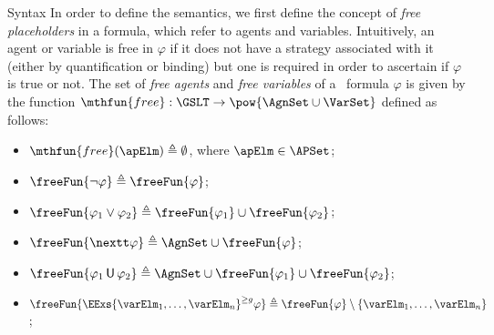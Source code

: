 \begin{subsection}{Syntax}
		In order to define the semantics, we first define the concept of
		\emph{free placeholders} in a formula, which refer to agents and variables.
		Intuitively, an agent or variable is free in $\varphi$ if it does
		not have a strategy associated with it (either by quantification or binding) but one is required in order
		to ascertain if $\varphi$ is true or not.
%		
								The set of \emph{free agents} and \emph{free variables} of a \GSLT\
								formula $\varphi$ is given by
								the function $\mthfun{free} : \GSLT \to \pow{\AgnSet \cup \VarSet}$
								defined as follows:
								\begin{itemize}
									\item
										$\mthfun{free}(\apElm) \defeq \emptyset$, where $\apElm \in \APSet$;
									\vspace{-0.35em}
									\item\label{def:sl(freeagvar:neg)}
										$\freeFun{\neg \varphi} \defeq \freeFun{\varphi}$;
									\vspace{-0.35em}
									\item\label{def:sl(freeagvar:conjdisj)}
										$\freeFun{\varphi_{1} \vee \varphi_{2}} \defeq \freeFun{\varphi_{1}}
										\cup \freeFun{\varphi_{2}}$;
									\vspace{-0.35em}
									\item\label{def:sl(freeagvar:next)}
										$\freeFun{\nextt \varphi} \defeq \AgnSet \cup \freeFun{\varphi}$;
									\vspace{-0.35em}
									\item\label{def:sl(freeagvar:untilrelease)}
										$\freeFun{\varphi_{1} \until \varphi_{2}} \defeq \AgnSet \cup
										\freeFun{\varphi_{1}} \cup \freeFun{\varphi_{2}}$;
									\vspace{-0.35em}
									\item\label{def:sl(freeagvar:qnt)}
										$\freeFun{\EExs{\varElm_{1},\ldots, \varElm_{n}}^{\geq g} \varphi}
										\defeq \freeFun{\varphi} \setminus \{ \varElm_{1},\ldots,
										\varElm_{n} \}$;

\end{itemize}
\end{subsection}
